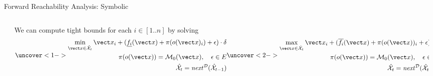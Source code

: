 \begin{frame}[fragile]{Forward Reachability Analysis: Symbolic}
\begin{columns}
\begin{column}{0.35\textwidth}
\begin{center}
{}
            \end{center}
        \end{column}
        \begin{column}{0.65\textwidth}
            We can compute tight bounds for each $i \in [1..n]$ by solving
            \abovedisplayskip=0pt
            \belowdisplayskip=0pt
            \begin{subequations}
                \uncover<1->{
                \begin{align}
                    \min_{\vec{x} \in \hat{\mathcal{X}}_t} \vec{x}_i + (\underline{f_i}(\vec{x}) + \pi(o(\vec{x})_i) + \epsilon) \cdot \delta \\
                    \quad \pi(o(\vec{x})) = \mathcal{M}_0(\vec{x}),
                    \quad \epsilon \in E \\
                    \hat{\mathcal{X}}_t = \mathit{next}^{\mathcal{D}}(\hat{\mathcal{X}}_{t-1})
                    \label{eq:LowerBound}
                \end{align}} \uncover<2->{\begin{align}
                    \max_{\vec{x} \in \hat{\mathcal{X}}_t} \vec{x}_i + (\overline{f_i}(\vec{x}) + \pi(o(\vec{x}))_i + \epsilon) \cdot \delta \\
                    \quad \pi(o(\vec{x})) = \mathcal{M}_0(\vec{x}),
                    \quad \epsilon \in E \\
                    \hat{\mathcal{X}}_t = \mathit{next}^{\mathcal{D}}(\hat{\mathcal{X}}_{t-1})
                    \label{eq:UpperBound}
                \end{align}}
                \label{eq:Reach}
                \end{subequations}
        \end{column}
    \end{columns}
\end{frame}